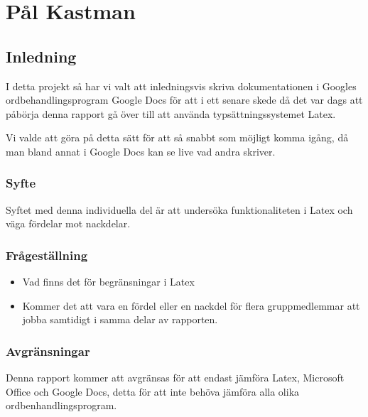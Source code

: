 \section{Pål Kastman}
\subsection{Inledning}
I detta projekt så har vi valt att inledningsvis skriva dokumentationen i Googles ordbehandlingsprogram Google Docs för att 
i ett senare skede då det var dags att påbörja denna rapport gå över till att använda typsättningssystemet Latex. 

Vi valde att göra på detta sätt för att så snabbt som möjligt komma igång, då man bland annat i Google Docs kan se live 
vad andra skriver.

\subsubsection{Syfte}
Syftet med denna individuella del är att undersöka funktionaliteten i Latex och väga fördelar mot nackdelar.

\subsubsection{Frågeställning}
\begin{itemize}
\item Vad finns det för begränsningar i Latex
\item Kommer det att vara en fördel eller en nackdel för flera gruppmedlemmar att jobba samtidigt i samma delar av rapporten.
\end{itemize}

\subsubsection{Avgränsningar}
Denna rapport kommer att avgränsas för att endast jämföra Latex, Microsoft Office och Google Docs, detta för att 
inte behöva jämföra alla olika ordbenhandlingsprogram.


